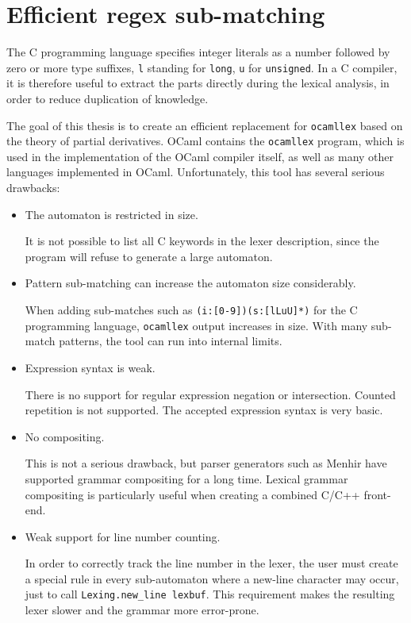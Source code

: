 \section{Efficient regex sub-matching}

The C programming language specifies integer literals as a number followed by
zero or more type suffixes, \texttt{l} standing for \texttt{long}, \texttt{u}
for \texttt{unsigned}. In a C compiler, it is therefore useful to extract the
parts directly during the lexical analysis, in order to reduce duplication of
knowledge.

The goal of this thesis is to create an efficient replacement for
\texttt{ocamllex} based on the theory of partial derivatives. OCaml contains the
\texttt{ocamllex} program, which is used in the implementation of the OCaml
compiler itself, as well as many other languages implemented in OCaml.
Unfortunately, this tool has several serious drawbacks:

\begin{itemize}
   \item The automaton is restricted in size.

      It is not possible to list all C keywords in the lexer description, since
      the program will refuse to generate a large automaton.

   \item Pattern sub-matching can increase the automaton size considerably.

      When adding sub-matches such as \verb!(i:[0-9])(s:[lLuU]*)! for the C
      programming language, \texttt{ocamllex} output increases in size. With
      many sub-match patterns, the tool can run into internal limits.

   \item Expression syntax is weak.

      There is no support for regular expression negation or intersection.
      Counted repetition is not supported. The accepted expression syntax is
      very basic.

   \item No compositing.

      This is not a serious drawback, but parser generators such as Menhir have
      supported grammar compositing for a long time. Lexical grammar compositing
      is particularly useful when creating a combined C/C++ front-end.

   \item Weak support for line number counting.

      In order to correctly track the line number in the lexer, the user must
      create a special rule in every sub-automaton where a new-line character
      may occur, just to call \texttt{Lexing.new\_line lexbuf}. This requirement
      makes the resulting lexer slower and the grammar more error-prone.

\end{itemize}

